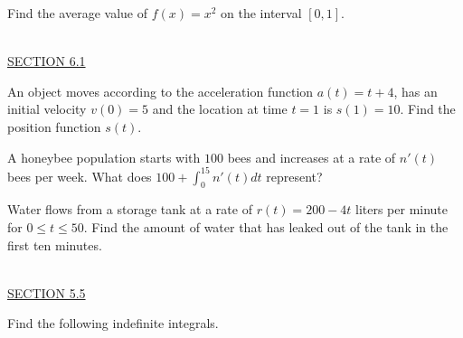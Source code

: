\documentclass{exam}
\begin{document}
\begin{questions}
\question Find the average value of $f(x) = x^2$ on the interval $[0,1]$. %


\ \\  
  \underline{SECTION 6.1}

\question An object moves according to the acceleration function $a(t)=t+4$, has an initial velocity $v(0)=5$ and the location at time $t=1$ is $s(1)=10$.  Find the position function $s(t)$. %

\question A honeybee population starts with $100$ bees and increases at a rate of $n'(t)$ bees per week.  What does $100+\displaystyle\int_0^{15}n'(t)dt$ represent? %

\question Water flows from a storage tank at a rate of $r(t)=200-4t$ liters per minute for $0\leq t\leq 50$.  Find the amount of water that has leaked out of the tank in the first ten minutes. %

\ \\
\underline{SECTION 5.5}

\question Find the following indefinite integrals.
  \begin{parts}
\end{parts}
\end{questions}
\end{document}
